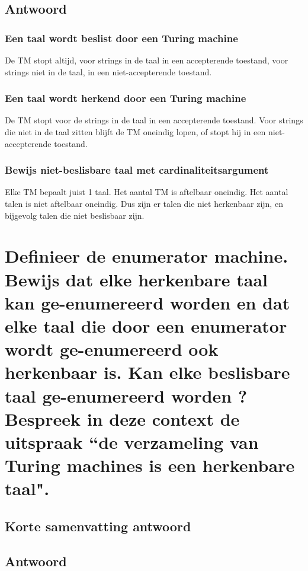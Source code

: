 \documentclass{article}
\begin{document}
    \subsection{Antwoord}
        \subsubsection{Een taal wordt beslist door een Turing machine}
            De TM stopt altijd, voor strings in de taal in een accepterende toestand, voor strings niet in de taal, in een niet-accepterende toestand.

        \subsubsection{Een taal wordt herkend door een Turing machine}
            De TM stopt voor de strings in de taal in een accepterende toestand. Voor strings die niet in de taal zitten blijft de TM oneindig lopen, of stopt hij in een niet-accepterende toestand.

        \subsubsection{Bewijs niet-beslisbare taal met cardinaliteitsargument}
            Elke TM bepaalt juist 1 taal. Het aantal TM is aftelbaar oneindig. Het aantal talen is niet aftelbaar oneindig. Dus zijn er talen die niet herkenbaar zijn, en bijgevolg talen die niet beslisbaar zijn.


\newpage
\section{Definieer de enumerator machine. Bewijs dat elke herkenbare taal kan ge-enumereerd worden en dat elke taal die door een enumerator wordt ge-enumereerd ook herkenbaar is. Kan elke beslisbare taal ge-enumereerd worden ? Bespreek in deze context de uitspraak ``de verzameling van Turing machines is een herkenbare taal".}
    \subsection{Korte samenvatting antwoord}

    \subsection{Antwoord}
\end{document}

